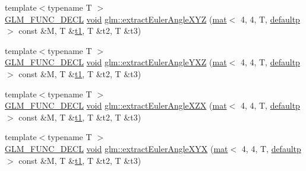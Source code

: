 \begin{DoxyCompactItemize}
\item 
{\footnotesize template$<$typename T $>$ }\\\mbox{\hyperlink{setup_8hpp_ab2d052de21a70539923e9bcbf6e83a51}{G\+L\+M\+\_\+\+F\+U\+N\+C\+\_\+\+D\+E\+CL}} \mbox{\hyperlink{_s_d_l__opengles2__gl2ext_8h_ae5d8fa23ad07c48bb609509eae494c95}{void}} \mbox{\hyperlink{group__gtx__euler__angles_gacea701562f778c1da4d3a0a1cf091000}{glm\+::extract\+Euler\+Angle\+X\+YZ}} (\mbox{\hyperlink{structglm_1_1mat}{mat}}$<$ 4, 4, T, \mbox{\hyperlink{namespaceglm_a36ed105b07c7746804d7fdc7cc90ff25a9d21ccd8b5a009ec7eb7677befc3bf51}{defaultp}} $>$ const \&M, T \&\mbox{\hyperlink{_s_d_l__opengl__glext_8h_af48031a37b713afa3b0d0d7d29653d7c}{t1}}, T \&t2, T \&t3)
\item 
{\footnotesize template$<$typename T $>$ }\\\mbox{\hyperlink{setup_8hpp_ab2d052de21a70539923e9bcbf6e83a51}{G\+L\+M\+\_\+\+F\+U\+N\+C\+\_\+\+D\+E\+CL}} \mbox{\hyperlink{_s_d_l__opengles2__gl2ext_8h_ae5d8fa23ad07c48bb609509eae494c95}{void}} \mbox{\hyperlink{group__gtx__euler__angles_gaf0937518e63037335a0e8358b6f053c5}{glm\+::extract\+Euler\+Angle\+Y\+XZ}} (\mbox{\hyperlink{structglm_1_1mat}{mat}}$<$ 4, 4, T, \mbox{\hyperlink{namespaceglm_a36ed105b07c7746804d7fdc7cc90ff25a9d21ccd8b5a009ec7eb7677befc3bf51}{defaultp}} $>$ const \&M, T \&\mbox{\hyperlink{_s_d_l__opengl__glext_8h_af48031a37b713afa3b0d0d7d29653d7c}{t1}}, T \&t2, T \&t3)
\item 
{\footnotesize template$<$typename T $>$ }\\\mbox{\hyperlink{setup_8hpp_ab2d052de21a70539923e9bcbf6e83a51}{G\+L\+M\+\_\+\+F\+U\+N\+C\+\_\+\+D\+E\+CL}} \mbox{\hyperlink{_s_d_l__opengles2__gl2ext_8h_ae5d8fa23ad07c48bb609509eae494c95}{void}} \mbox{\hyperlink{group__gtx__euler__angles_gacf0bc6c031f25fa3ee0055b62c8260d0}{glm\+::extract\+Euler\+Angle\+X\+ZX}} (\mbox{\hyperlink{structglm_1_1mat}{mat}}$<$ 4, 4, T, \mbox{\hyperlink{namespaceglm_a36ed105b07c7746804d7fdc7cc90ff25a9d21ccd8b5a009ec7eb7677befc3bf51}{defaultp}} $>$ const \&M, T \&\mbox{\hyperlink{_s_d_l__opengl__glext_8h_af48031a37b713afa3b0d0d7d29653d7c}{t1}}, T \&t2, T \&t3)
\item 
{\footnotesize template$<$typename T $>$ }\\\mbox{\hyperlink{setup_8hpp_ab2d052de21a70539923e9bcbf6e83a51}{G\+L\+M\+\_\+\+F\+U\+N\+C\+\_\+\+D\+E\+CL}} \mbox{\hyperlink{_s_d_l__opengles2__gl2ext_8h_ae5d8fa23ad07c48bb609509eae494c95}{void}} \mbox{\hyperlink{group__gtx__euler__angles_gaf1077a72171d0f3b08f022ab5ff88af7}{glm\+::extract\+Euler\+Angle\+X\+YX}} (\mbox{\hyperlink{structglm_1_1mat}{mat}}$<$ 4, 4, T, \mbox{\hyperlink{namespaceglm_a36ed105b07c7746804d7fdc7cc90ff25a9d21ccd8b5a009ec7eb7677befc3bf51}{defaultp}} $>$ const \&M, T \&\mbox{\hyperlink{_s_d_l__opengl__glext_8h_af48031a37b713afa3b0d0d7d29653d7c}{t1}}, T \&t2, T \&t3)

\end{DoxyCompactItemize}
